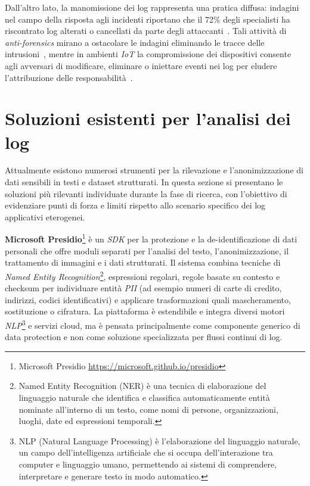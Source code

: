 \documentclass[12pt,twoside]{report}
\begin{document}
Dall'altro lato, la manomissione dei log rappresenta una pratica diffusa: indagini nel campo della risposta agli incidenti riportano che il 72\% degli specialisti ha riscontrato log alterati o cancellati da parte degli attaccanti~\cite{paccagnella2020custos}. Tali attività di \textit{anti-forensics} mirano a ostacolare le indagini eliminando le tracce delle intrusioni~\cite{jena2012audit_log_hash}, mentre in ambienti \textit{IoT} la compromissione dei dispositivi consente agli avversari di modificare, eliminare o iniettare eventi nei log per eludere l'attribuzione delle responsabilità~\cite{koisser2023accountability_iot_logging}.

\section{Soluzioni esistenti per l'analisi dei log}
\label{sec:soluzioni_esistenti_analisi_log}

Attualmente esistono numerosi strumenti per la rilevazione e l'anonimizzazione di dati sensibili in testi e dataset strutturati. In questa sezione si presentano le soluzioni più rilevanti individuate durante la fase di ricerca, con l'obiettivo di evidenziare punti di forza e limiti rispetto allo scenario specifico dei log applicativi eterogenei.

\textbf{Microsoft Presidio}\footnote{Microsoft Presidio \url{https://microsoft.github.io/presidio}} è un \textit{SDK} per la protezione e la de-identificazione di dati personali che offre moduli separati per l'analisi del testo, l'anonimizzazione, il trattamento di immagini e i dati strutturati. Il sistema combina tecniche di \textit{Named Entity Recognition}\footnote{Named Entity Recognition (NER) è una tecnica di elaborazione del linguaggio naturale che identifica e classifica automaticamente entità nominate all'interno di un testo, come nomi di persone, organizzazioni, luoghi, date ed espressioni temporali.}, espressioni regolari, regole basate su contesto e checksum per individuare entità \textit{PII} (ad esempio numeri di carte di credito, indirizzi, codici identificativi) e applicare trasformazioni quali mascheramento, sostituzione o cifratura. La piattaforma è estendibile e integra diversi motori \textit{NLP}\footnote{NLP (Natural Language Processing) è l'elaborazione del linguaggio naturale, un campo dell'intelligenza artificiale che si occupa dell'interazione tra computer e linguaggio umano, permettendo ai sistemi di comprendere, interpretare e generare testo in modo automatico.} e servizi cloud, ma è pensata principalmente come componente generico di data protection e non come soluzione specializzata per flussi continui di log.
\end{document}
